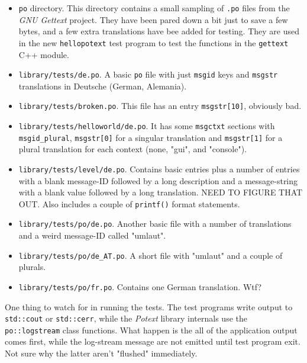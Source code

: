    \begin{itemize}
      \item \texttt{po} directory.
         This directory contains a small sampling of \texttt{.po}
         files from the \textsl{GNU Gettext} project.
         They have been pared down a bit just to save a few bytes,
         and a few extra translations have bee added for testing.
         They are used in the new
         \texttt{hellopotext} test program to
         test the functions in the \texttt{gettext} C++ module.
      \item \texttt{library/tests/de.po}.
         A basic \texttt{po} file with just
         \texttt{msgid} keys and
         \texttt{msgstr} translations in Deutsche (German, Alemania).
      \item \texttt{library/tests/broken.po}.
         This file has an entry \texttt{msgstr[10]}, obviously bad.
      \item \texttt{library/tests/helloworld/de.po}.
         It has some \texttt{msgctxt} sections with
         \texttt{msgid\_plural},
         \texttt{msgstr[0]} for a singular translation and
         \texttt{msgstr[1]} for a plural translation 
         for each context (none, "gui", and "console").
      \item \texttt{library/tests/level/de.po}.
         Contains basic entries plus a number of entries with a blank
         message-ID followed by a long description and a message-string
         with a blank value followed by a long translation.
         NEED TO FIGURE THAT OUT.
         Also includes a couple of \texttt{printf()} format statements.
      \item \texttt{library/tests/po/de.po}.
         Another basic file with a number of translations and a
         weird message-ID called "umlaut".
      \item \texttt{library/tests/po/de\_AT.po}.
         A short file with "umlaut" and a couple of plurals.
      \item \texttt{library/tests/po/fr.po}.
         Contains one German translation. Wtf?
   \end{itemize}

   One thing to watch for in running the tests.
   The test programs write output to \texttt{std::cout} or
   \texttt{std::cerr}, while the \textsl{Potext} library
   internals use the \texttt{po::logstream} class functions.
   What happen is the all of the application output comes first,
   while the log-stream message are not emitted until
   test program exit.
   Not sure why the latter aren't "flushed" immediately.

